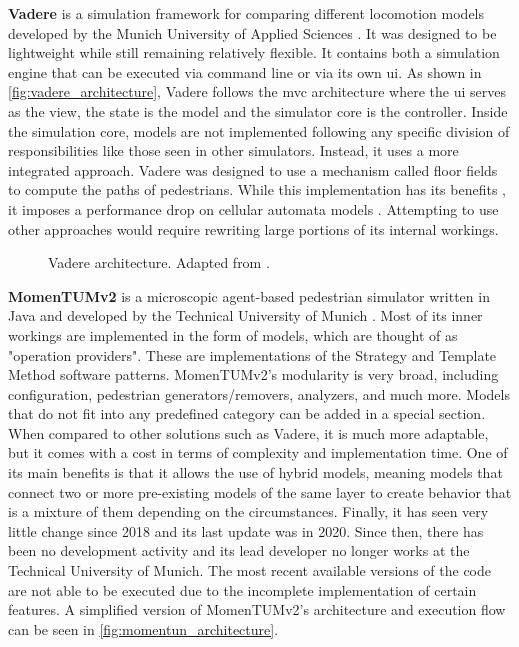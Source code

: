 \documentclass[twoside, 11pt]{article}
\begin{document}
\textbf{Vadere} is a simulation framework for comparing different locomotion models developed by the Munich University of Applied Sciences \cite{kleinmeierVadereOpenSourceSimulation2019}. It was designed to be lightweight while still remaining relatively flexible. It contains both a simulation engine that can be executed via command line or via its own \gls{ui}. As shown in \autoref{fig:vadere_architecture}, Vadere follows the \gls{mvc} architecture where the \gls{ui} serves as the view, the state is the model and the simulator core is the controller. Inside the simulation core, models are not implemented following any specific division of responsibilities like those seen in other simulators. Instead, it uses a more integrated approach. Vadere was designed to use a mechanism called floor fields to compute the paths of pedestrians. While this implementation has its benefits \cite{seitzSuperpositionPrincipleConceptual2016}, it imposes a performance drop on cellular automata models \cite{kleinmeierVadereOpenSourceSimulation2019}. Attempting to use other approaches would require rewriting large portions of its internal workings.

\begin{figure}[h]
  \centering
  
  \caption[Vadere architecture]{Vadere architecture. Adapted from \cite{seitzSuperpositionPrincipleConceptual2016}.}
  \label{fig:vadere_architecture}
\end{figure}

\textbf{MomenTUMv2} is a microscopic agent-based pedestrian simulator written in Java and developed by the Technical University of Munich \cite{kielarMomenTUMv2ModularExtensible2016}. Most of its inner workings are implemented in the form of models, which are thought of as "operation providers". These are implementations of the Strategy and Template Method software patterns. MomenTUMv2's modularity is very broad, including configuration, pedestrian generators/removers, analyzers, and much more. Models that do not fit into any predefined category can be added in a special section. When compared to other solutions such as Vadere, it is much more adaptable, but it comes with a cost in terms of complexity and implementation time. One of its main benefits is that it allows the use of hybrid models, meaning models that connect two or more pre-existing models of the same layer to create behavior that is a mixture of them depending on the circumstances. Finally, it has seen very little change since 2018 and its last update was in 2020. Since then, there has been no development activity and its lead developer no longer works at the Technical University of Munich. The most recent available versions of the code are not able to be executed due to the incomplete implementation of certain features. A simplified version of MomenTUMv2's architecture and execution flow can be seen in \autoref{fig:momentun_architecture}.
\end{document}
